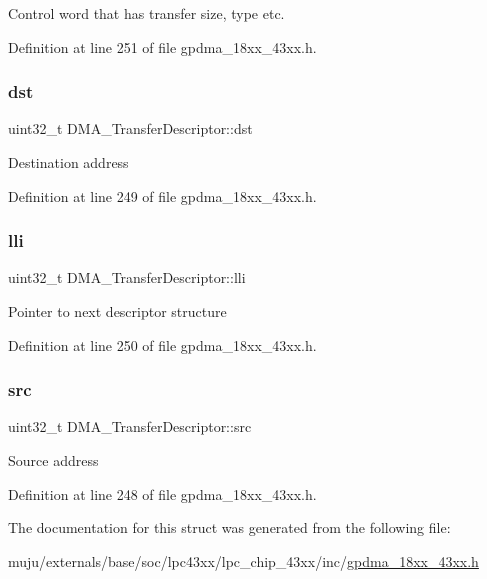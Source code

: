 Control word that has transfer size, type etc. 

Definition at line 251 of file gpdma\+\_\+18xx\+\_\+43xx.\+h.

\mbox{\label{struct_d_m_a___transfer_descriptor_a661ff33fa31f405b89905f385299e271}} 
\subsubsection{\texorpdfstring{dst}{dst}}
{\footnotesize\ttfamily uint32\+\_\+t D\+M\+A\+\_\+\+Transfer\+Descriptor\+::dst}

Destination address 

Definition at line 249 of file gpdma\+\_\+18xx\+\_\+43xx.\+h.

\mbox{\label{struct_d_m_a___transfer_descriptor_ad53035ccb28664c56800a73bb20a7c79}} 
\subsubsection{\texorpdfstring{lli}{lli}}
{\footnotesize\ttfamily uint32\+\_\+t D\+M\+A\+\_\+\+Transfer\+Descriptor\+::lli}

Pointer to next descriptor structure 

Definition at line 250 of file gpdma\+\_\+18xx\+\_\+43xx.\+h.

\mbox{\label{struct_d_m_a___transfer_descriptor_a03862efce0e0845dce0cd47e51ed038f}} 
\subsubsection{\texorpdfstring{src}{src}}
{\footnotesize\ttfamily uint32\+\_\+t D\+M\+A\+\_\+\+Transfer\+Descriptor\+::src}

Source address 

Definition at line 248 of file gpdma\+\_\+18xx\+\_\+43xx.\+h.



The documentation for this struct was generated from the following file\+:\begin{DoxyCompactItemize}
\item 
muju/externals/base/soc/lpc43xx/lpc\+\_\+chip\+\_\+43xx/inc/\hyperlink{gpdma__18xx__43xx_8h}{gpdma\+\_\+18xx\+\_\+43xx.\+h}\end{DoxyCompactItemize}
